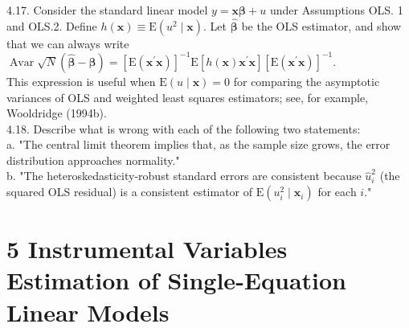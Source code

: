 \documentclass[10pt]{article}
\begin{document}
4.17. Consider the standard linear model $y=\mathbf{x} \boldsymbol{\beta}+u$ under Assumptions OLS. 1 and OLS.2. Define $h(\mathbf{x}) \equiv \mathrm{E}\left(u^{2} \mid \mathbf{x}\right)$. Let $\hat{\boldsymbol{\beta}}$ be the OLS estimator, and show that we can always write\\
$\operatorname{Avar} \sqrt{N}(\hat{\boldsymbol{\beta}}-\boldsymbol{\beta})=\left[\mathrm{E}\left(\mathbf{x}^{\prime} \mathbf{x}\right)\right]^{-1} \mathrm{E}\left[h(\mathbf{x}) \mathbf{x}^{\prime} \mathbf{x}\right]\left[\mathrm{E}\left(\mathbf{x}^{\prime} \mathbf{x}\right)\right]^{-1}$.\\
This expression is useful when $\mathrm{E}(u \mid \mathbf{x})=0$ for comparing the asymptotic variances of OLS and weighted least squares estimators; see, for example, Wooldridge (1994b).\\
4.18. Describe what is wrong with each of the following two statements:\\
a. "The central limit theorem implies that, as the sample size grows, the error distribution approaches normality."\\
b. "The heteroskedasticity-robust standard errors are consistent because $\hat{u}_{i}^{2}$ (the squared OLS residual) is a consistent estimator of $\mathrm{E}\left(u_{i}^{2} \mid \mathbf{x}_{i}\right)$ for each $i$."

\section*{5 Instrumental Variables Estimation of Single-Equation Linear Models}
\end{document}
